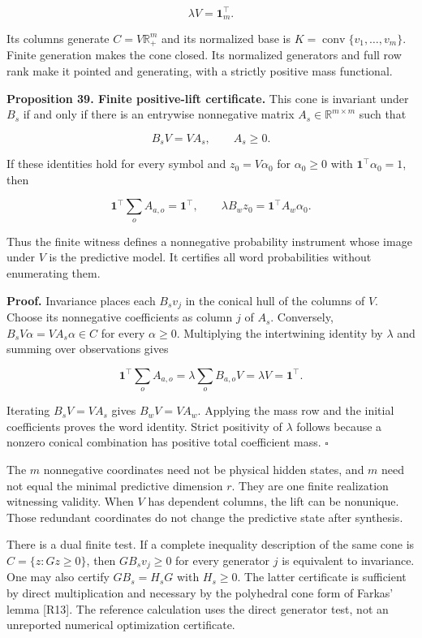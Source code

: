 \[
\lambda V=\mathbf1_m^\top.
\]

Its columns generate \(C=V\mathbb R_+^m\) and its normalized base is
\(K=\operatorname{conv}\{v_1,\ldots,v_m\}\). Finite generation makes the
cone closed. Its normalized generators and full row rank make it pointed
and generating, with a strictly positive mass functional.

\textbf{Proposition 39. Finite positive-lift certificate.} This cone is
invariant under \(B_s\) if and only if there is an entrywise nonnegative
matrix \(A_s\in\mathbb R^{m\times m}\) such that

\[
\boxed{B_sV=VA_s,\qquad A_s\geq0.}
\]

If these identities hold for every symbol and \(z_0=V\alpha_0\) for
\(\alpha_0\geq0\) with \(\mathbf1^\top\alpha_0=1\), then

\[
\mathbf1^\top\sum_o A_{a,o}=\mathbf1^\top,
\qquad
\lambda B_wz_0=\mathbf1^\top A_w\alpha_0.
\]

Thus the finite witness defines a nonnegative probability instrument
whose image under \(V\) is the predictive model. It certifies all word
probabilities without enumerating them.

\textbf{Proof.} Invariance places each \(B_sv_j\) in the conical hull of
the columns of \(V\). Choose its nonnegative coefficients as column
\(j\) of \(A_s\). Conversely, \(B_sV\alpha=VA_s\alpha\in C\) for every
\(\alpha\geq0\). Multiplying the intertwining identity by \(\lambda\)
and summing over observations gives

\[
\mathbf1^\top\sum_oA_{a,o}
=\lambda\sum_oB_{a,o}V
=\lambda V=\mathbf1^\top.
\]

Iterating \(B_sV=VA_s\) gives \(B_wV=VA_w\). Applying the mass row and
the initial coefficients proves the word identity. Strict positivity of
\(\lambda\) follows because a nonzero conical combination has positive
total coefficient mass. \(\square\)

The \(m\) nonnegative coordinates need not be physical hidden states,
and \(m\) need not equal the minimal predictive dimension \(r\). They
are one finite realization witnessing validity. When \(V\) has dependent
columns, the lift can be nonunique. Those redundant coordinates do not
change the predictive state after synthesis.

There is a dual finite test. If a complete inequality description of the
same cone is \(C=\{z:Gz\geq0\}\), then \(GB_sv_j\geq0\) for every
generator \(j\) is equivalent to invariance. One may also certify
\(GB_s=H_sG\) with \(H_s\geq0\). The latter certificate is sufficient by
direct multiplication and necessary by the polyhedral cone form of
Farkas' lemma {[}R13{]}. The reference calculation uses the direct
generator test, not an unreported numerical optimization certificate.

